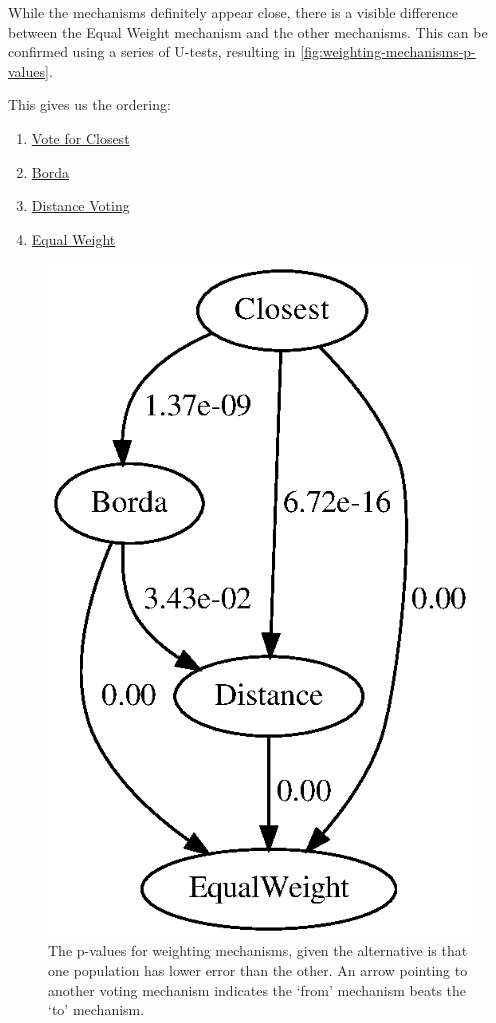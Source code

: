 While the mechanisms definitely appear close, there is a visible difference between
the Equal Weight mechanism and the other mechanisms.
This can be confirmed using a series of U-tests, resulting in
\autoref{fig:weighting-mechanisms-p-values}.
\begin{samepage}
    This gives us the ordering:
    \begin{enumerate}
        \item \hyperref[para:closest]{Vote for Closest}
        \item \hyperref[para:borda]{Borda}
        \item \hyperref[para:distance-voting]{Distance Voting}
        \item \hyperref[para:equal-weight]{Equal Weight}
    \end{enumerate}
\end{samepage}

\begin{figure}[htbp]
    \centering
    \includegraphics[scale=0.75]
    {./content/figures/weighting_mechanisms/weighting-mechanisms-p-values.gv}
    \caption{The p-values for weighting mechanisms, given the alternative is that one
    population has lower error than the other.
    An arrow pointing to another voting mechanism indicates the `from' mechanism
    beats the `to' mechanism.}
    \label{fig:weighting-mechanisms-p-values}
\end{figure}

